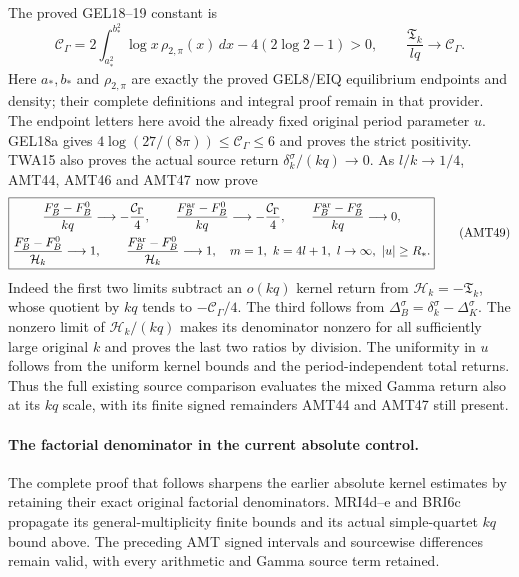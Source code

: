 \documentclass[11pt,a4paper]{article}
\begin{document}
The proved GEL18--19 constant is
\[
 \mathcal C_\Gamma=2\int_{a_*^2}^{b_*^2}\log x\,
                       \rho_{2,\pi}(x)\,dx-4(2\log2-1)>0,
 \qquad \frac{\mathfrak T_k}{lq}\longrightarrow\mathcal C_\Gamma.
 \tag{AMT48}
\]
Here $a_*,b_*$ and $\rho_{2,\pi}$ are exactly the proved GEL8/EIQ
equilibrium endpoints and density; their complete definitions and
integral proof remain in that provider. The endpoint letters here
avoid the already fixed original period parameter $u$. GEL18a
gives $4\log(27/(8\pi))\le\mathcal C_\Gamma\le6$ and proves
the strict positivity. TWA15 also proves the actual source return
$\delta_k^\sigma/(kq)\to0$. As $l/k\to1/4$, AMT44, AMT46
and AMT47 now prove
\[
\boxed{\begin{gathered}
 \frac{F_B^\sigma-F_B^0}{kq}\longrightarrow-\frac{\mathcal C_\Gamma}{4},
 \qquad
 \frac{F_B^{\rm ar}-F_B^0}{kq}\longrightarrow-\frac{\mathcal C_\Gamma}{4},
 \qquad
 \frac{F_B^{\rm ar}-F_B^\sigma}{kq}\longrightarrow0,\\
 \frac{F_B^\sigma-F_B^0}{\mathcal H_k}\longrightarrow1,
 \qquad
 \frac{F_B^{\rm ar}-F_B^0}{\mathcal H_k}\longrightarrow1,
 \quad m=1,\ k=4l+1,\ l\to\infty,\ |u|\ge R_*.
\end{gathered}}\tag{AMT49}
\]
Indeed the first two limits subtract an $o(kq)$ kernel return
from $\mathcal H_k=-\mathfrak T_k$, whose quotient by $kq$
tends to $-\mathcal C_\Gamma/4$. The third follows from
$\Delta_B^\sigma=\delta_k^\sigma-\Delta_K^\sigma$.
The nonzero limit of $\mathcal H_k/(kq)$ makes its denominator
nonzero for all sufficiently large original $k$ and proves the
last two ratios by division. The uniformity in $u$ follows from
the uniform kernel bounds and the period-independent total returns.
Thus the full existing source comparison evaluates the mixed
Gamma return also at its $kq$ scale, with its finite signed
remainders AMT44 and AMT47 still present.


\paragraph{The factorial denominator in the current absolute control.}
The complete proof that follows sharpens the earlier absolute
kernel estimates by retaining their exact original factorial
denominators. MRI4d--e and BRI6c propagate its general-multiplicity
finite bounds and its actual simple-quartet $kq$ bound above.
The preceding AMT signed intervals and sourcewise differences
remain valid, with every arithmetic and Gamma source term retained.
\end{document}
